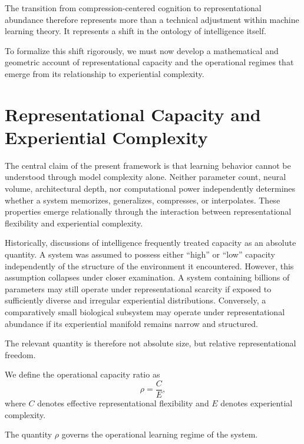 \documentclass[12pt,a4paper]{article}
\begin{document}
The transition from compression-centered cognition to representational abundance therefore represents more than a technical adjustment within machine learning theory. It represents a shift in the ontology of intelligence itself.

To formalize this shift rigorously, we must now develop a mathematical and geometric account of representational capacity and the operational regimes that emerge from its relationship to experiential complexity.


\section{Representational Capacity and Experiential Complexity}

The central claim of the present framework is that learning behavior cannot be understood through model complexity alone. Neither parameter count, neural volume, architectural depth, nor computational power independently determines whether a system memorizes, generalizes, compresses, or interpolates. These properties emerge relationally through the interaction between representational flexibility and experiential complexity.

Historically, discussions of intelligence frequently treated capacity as an absolute quantity. A system was assumed to possess either ``high'' or ``low'' capacity independently of the structure of the environment it encountered. However, this assumption collapses under closer examination. A system containing billions of parameters may still operate under representational scarcity if exposed to sufficiently diverse and irregular experiential distributions. Conversely, a comparatively small biological subsystem may operate under representational abundance if its experiential manifold remains narrow and structured.

The relevant quantity is therefore not absolute size, but relative representational freedom.

We define the operational capacity ratio as
\[
\rho = \frac{C}{E},
\]
where \(C\) denotes effective representational flexibility and \(E\) denotes experiential complexity.

The quantity \(\rho\) governs the operational learning regime of the system.
\end{document}
